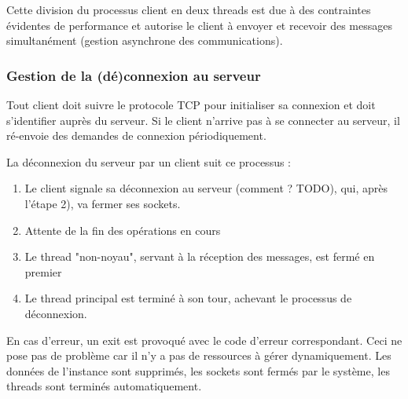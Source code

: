 \documentclass{article}
\begin{document}
 \noindent Cette division du processus client en deux threads est due à des contraintes évidentes de performance et autorise le client à envoyer et recevoir des messages simultanément (gestion asynchrone des communications).



\subsubsection{Gestion de la (dé)connexion au serveur}
\noindent Tout client doit suivre le protocole TCP \cite{TCP-IP} pour initialiser sa connexion et doit s'identifier auprès du serveur. Si le client n'arrive pas à se connecter au serveur, il ré-envoie des demandes de connexion périodiquement.


\noindent La déconnexion du serveur par un client suit ce processus :
\begin{enumerate}
    \item Le client signale sa déconnexion au serveur (comment ? TODO), qui, après l'étape 2), va fermer ses sockets.
    \item Attente de la fin des opérations en cours
    \item Le thread "non-noyau", servant à la réception des messages, est fermé en premier
    \item Le thread principal est terminé à son tour, achevant le processus de déconnexion.
\end{enumerate}


En cas d'erreur, un exit est provoqué avec le code d'erreur correspondant. Ceci ne pose pas de problème car il n'y a pas de ressources à gérer dynamiquement. Les données de l'instance sont supprimés, les sockets sont fermés par le système, les threads sont terminés automatiquement.
\end{document}

